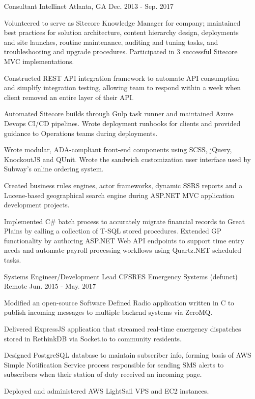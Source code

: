 \begin{cventries}
  \cventry
    {Consultant} %
    {Intellinet} %
    {Atlanta, GA} %
    {Dec. 2013 - Sep. 2017} %
    {
      \begin{cvitems} %
      	\item {Volunteered to serve as Sitecore Knowledge Manager for company; maintained best practices for solution architecture, content hierarchy design, deployments and site launches, routine maintenance, auditing and tuning tasks, and troubleshooting and upgrade procedures. Participated in 3 successful Sitecore MVC implementations.}
        \item {Constructed REST API integration framework to automate API consumption and simplify integration testing, allowing team to respond within a week when client removed an entire layer of their API.}
        \item {Automated Sitecore builds through Gulp task runner and maintained Azure Devops CI/CD pipelines. Wrote deployment runbooks for clients and provided guidance to Operations teams during deployments.}
        \item {Wrote modular, ADA-compliant front-end components using SCSS, jQuery, KnockoutJS and QUnit. Wrote the sandwich customization user interface used by Subway's online ordering system.}
        \item {Created business rules engines, actor frameworks, dynamic SSRS reports and a Lucene-based geographical search engine during ASP.NET MVC application development projects.}
        \item {Implemented C\# batch process to accurately migrate financial records to Great Plains by calling a collection of T-SQL stored procedures. Extended GP functionality by authoring ASP.NET Web API endpoints to support time entry needs and automate payroll processing workflows using Quartz.NET scheduled tasks.}
      \end{cvitems}
    }

  \cventry
    {Systems Engineer/Development Lead} %
    {CFSRES Emergency Systems (defunct)} %
    {Remote} %
    {Jun. 2015 - May. 2017} %
    {
      \begin{cvitems} %
        \item {Modified an open-source Software Defined Radio application written in C to publish incoming messages to multiple backend systems via ZeroMQ.}
        \item {Delivered ExpressJS application that streamed real-time emergency dispatches stored in RethinkDB via Socket.io to community residents.}
        \item {Designed PostgreSQL database to maintain subscriber info, forming basis of AWS Simple Notification Service process responsible for sending SMS alerts to subscribers when their station of duty received an incoming page.}
        \item {Deployed and administered AWS LightSail VPS and EC2 instances.}
      \end{cvitems}
    }


\end{cventries}
